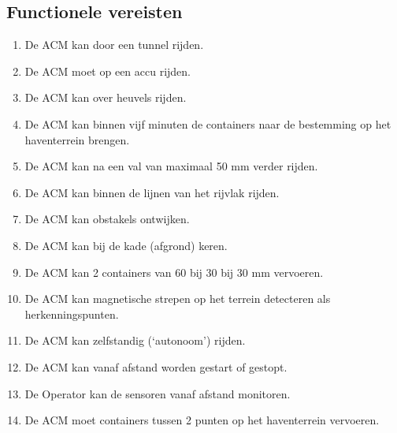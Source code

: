 \subsection{Functionele vereisten}
\begin{enumerate}
    \item De ACM kan door een tunnel rijden.
    \item De ACM moet op een accu rijden.
    \item De ACM kan over heuvels rijden.
    \item De ACM kan binnen vijf minuten de containers naar de bestemming op het haventerrein brengen.
    \item De ACM kan na een val van maximaal 50 mm verder rijden.
    \item De ACM kan binnen de lijnen van het rijvlak rijden.
    \item De ACM kan obstakels ontwijken.
    \item De ACM kan bij de kade (afgrond) keren.
    \item De ACM kan 2 containers van 60 bij 30 bij 30 mm vervoeren.
    \item De ACM kan magnetische strepen op het terrein detecteren als herkenningspunten.
    \item De ACM kan zelfstandig (‘autonoom’) rijden.
    \item De ACM kan vanaf afstand worden gestart of gestopt.
    \item De Operator kan de sensoren vanaf afstand monitoren.
    \item De ACM moet containers tussen 2 punten op het haventerrein vervoeren.
\end{enumerate}

